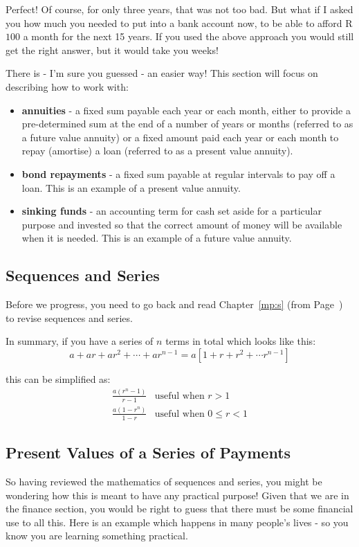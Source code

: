 Perfect! Of course, for only three years, that was not too bad. But what if I asked you how much you needed to put into a bank account now, to be able to afford R$100$ a month for the next 15 years. If you used the above approach you would still get the right answer, but it would take you weeks!

There is - I'm sure you guessed - an easier way! This section will focus on describing how to work with:
\begin{itemize}
\item{\textbf{annuities} - a fixed sum payable each year or each month, either to provide a pre-determined sum at the end of a number of years or months (referred to as a future value annuity) or a fixed amount paid each year or each month to repay (amortise) a loan (referred to as a present value annuity).}
\item{\textbf{bond repayments} - a fixed sum payable at regular intervals to pay off a loan. This is an example of a present value annuity.}
\item{\textbf{sinking funds} - an accounting term for cash set aside for a particular purpose and invested so that the correct amount of money will be available when it is needed. This is an example of a future value annuity.}
\end{itemize}

\subsection{Sequences and Series}
\label{m:f:ss}
Before we progress, you need to go back and read Chapter~\ref{mp:s} (from Page~\pageref{mp:s}) to revise sequences and series.

In summary, if you have a series of $n$ terms in total which looks like this:
\begin{equation*}
a + ar + ar^2 + \cdots + ar^{n-1} = a [ 1 + r + r^2 + \cdots r^{n-1} ]
\end{equation*}

this can be simplified as:
\begin{eqnarray*}
\frac{a (r^n - 1)}{r-1} &\mbox{useful when $r>1$}\\
\frac{a (1 - r^n)}{1-r} &\mbox{useful when $0\le r <1$}
\end{eqnarray*}

\subsection{Present Values of a Series of Payments}\label{presentvalues}
So having reviewed the mathematics of sequences and series, you might be wondering how this is meant to have any practical purpose! Given that we are in the finance section, you would be right to guess that there must be some financial use to all this. Here is an example which happens in many people's lives - so you know you are learning something practical.

